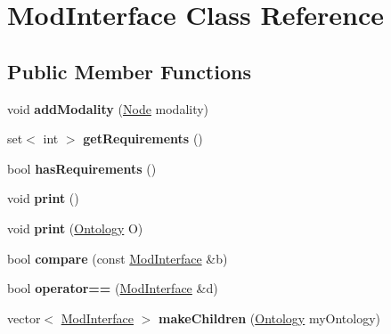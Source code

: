 \hypertarget{classModInterface}{\section{\-Mod\-Interface \-Class \-Reference}
\label{classModInterface}
}
\subsection*{\-Public \-Member \-Functions}
\begin{DoxyCompactItemize}
\item 
\hypertarget{classModInterface_a2e25d74d769947d55381e33bdbebe494}{void {\bfseries add\-Modality} (\hyperlink{classNode}{\-Node} modality)}\label{classModInterface_a2e25d74d769947d55381e33bdbebe494}

\item 
\hypertarget{classModInterface_a21d5614d28e37f6692ac39ddef4e32a7}{set$<$ int $>$ {\bfseries get\-Requirements} ()}\label{classModInterface_a21d5614d28e37f6692ac39ddef4e32a7}

\item 
\hypertarget{classModInterface_af2cbbfa7a3d4c615a43254bc1343e9e1}{bool {\bfseries has\-Requirements} ()}\label{classModInterface_af2cbbfa7a3d4c615a43254bc1343e9e1}

\item 
\hypertarget{classModInterface_a02dbe79e4bf1a6d580ba294b2cbaa54d}{void {\bfseries print} ()}\label{classModInterface_a02dbe79e4bf1a6d580ba294b2cbaa54d}

\item 
\hypertarget{classModInterface_a4bac677e05932de188a80c56124c70b1}{void {\bfseries print} (\hyperlink{classOntology}{\-Ontology} \-O)}\label{classModInterface_a4bac677e05932de188a80c56124c70b1}

\item 
\hypertarget{classModInterface_a52601b4a8f71ddc7179f41cbd496f7cf}{bool {\bfseries compare} (const \hyperlink{classModInterface}{\-Mod\-Interface} \&b)}\label{classModInterface_a52601b4a8f71ddc7179f41cbd496f7cf}

\item 
\hypertarget{classModInterface_a3eecf990719d23145f24a51547c0f5ee}{bool {\bfseries operator==} (\hyperlink{classModInterface}{\-Mod\-Interface} \&d)}\label{classModInterface_a3eecf990719d23145f24a51547c0f5ee}

\item 
\hypertarget{classModInterface_a850dbaaae8aaca9a36071782aa66b1f7}{vector$<$ \hyperlink{classModInterface}{\-Mod\-Interface} $>$ {\bfseries make\-Children} (\hyperlink{classOntology}{\-Ontology} my\-Ontology)}\label{classModInterface_a850dbaaae8aaca9a36071782aa66b1f7}

\end{DoxyCompactItemize}
